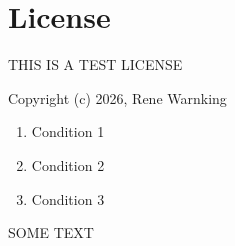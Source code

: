 \section{License}

THIS IS A TEST LICENSE

Copyright (c) 2026, Rene Warnking

\begin{enumerate}
   \item Condition 1
   \item Condition 2
   \item Condition 3
\end{enumerate}

SOME TEXT

\clearpage
